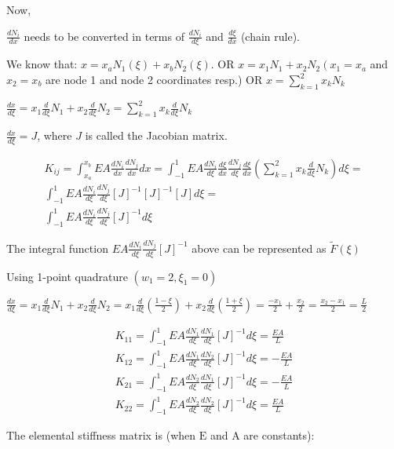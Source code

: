 \documentclass[10pt]{article}
\begin{document}
Now,

$\frac{d N_{i}}{d x}$ needs to be converted in terms of $\frac{d N_{i}}{d \xi}$ and $\frac{d \xi}{d x}$ (chain rule).

We know that: $x=x_{a} N_{1}(\xi)+x_{b} N_{2}(\xi)$. OR $x=x_{1} N_{1}+x_{2} N_{2}\left(x_{1}=x_{a}\right.$ and $x_{2}=x_{b}$ are node 1 and node 2 coordinates resp.) OR $x=\sum_{k=1}^{2} x_{k} N_{k}$

$\frac{d x}{d \xi}=x_{1} \frac{d}{d \xi} N_{1}+x_{2} \frac{d}{d \xi} N_{2}=\sum_{k=1}^{2} x_{k} \frac{d}{d \xi} N_{k}$

$\frac{d x}{d \xi}=J$, where $J$ is called the Jacobian matrix.

$$
\begin{gathered}
K_{i j}=\int_{x_{a}}^{x_{b}} E A \frac{d N_{i}}{d x} \frac{d N_{j}}{d x} d x=\int_{-1}^{1} E A \frac{d N_{i}}{d \xi} \frac{d \xi}{d x} \frac{d N_{j}}{d \xi} \frac{d \xi}{d x}\left(\sum_{k=1}^{2} x_{k} \frac{d}{d \xi} N_{k}\right) d \xi= \\
\int_{-1}^{1} E A \frac{d N_{i}}{d \xi} \frac{d N_{j}}{d \xi}[J]^{-1}[J]^{-1}[J] d \xi= \\
\int_{-1}^{1} E A \frac{d N_{i}}{d \xi} \frac{d N_{j}}{d \xi}[J]^{-1} d \xi
\end{gathered}
$$

The integral function $E A \frac{d N_{i}}{d \xi} \frac{d N_{j}}{d \xi}[J]^{-1}$ above can be represented as $\tilde{F}(\xi)$

Using 1-point quadrature $\left(w_{1}=2, \xi_{1}=0\right)$

$\frac{d x}{d \xi}=x_{1} \frac{d}{d \xi} N_{1}+x_{2} \frac{d}{d \xi} N_{2}=x_{1} \frac{d}{d \xi}\left(\frac{1-\xi}{2}\right)+x_{2} \frac{d}{d \xi}\left(\frac{1+\xi}{2}\right)=\frac{-x_{1}}{2}+\frac{x_{2}}{2}=\frac{x_{2}-x_{1}}{2}=\frac{L}{2}$

$$
\begin{gathered}
K_{11}=\int_{-1}^{1} E A \frac{d N_{1}}{d \xi} \frac{d N_{1}}{d \xi}[J]^{-1} d \xi=\frac{E A}{L} \\
K_{12}=\int_{-1}^{1} E A \frac{d N_{1}}{d \xi} \frac{d N_{2}}{d \xi}[J]^{-1} d \xi=-\frac{E A}{L} \\
K_{21}=\int_{-1}^{1} E A \frac{d N_{2}}{d \xi} \frac{d N_{1}}{d \xi}[J]^{-1} d \xi=-\frac{E A}{L} \\
K_{22}=\int_{-1}^{1} E A \frac{d N_{2}}{d \xi} \frac{d N_{2}}{d \xi}[J]^{-1} d \xi=\frac{E A}{L}
\end{gathered}
$$

The elemental stiffness matrix is (when $\mathrm{E}$ and $\mathrm{A}$ are constants):
\end{document}
